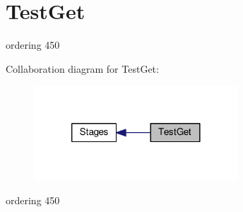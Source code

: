 \hypertarget{group__TestGet}{\section{Test\-Get}
\label{group__TestGet}
}


ordering 450  


Collaboration diagram for Test\-Get\-:
\nopagebreak
\begin{figure}[H]
\begin{center}
\leavevmode
\includegraphics[width=216pt]{group__TestGet}
\end{center}
\end{figure}
ordering 450 